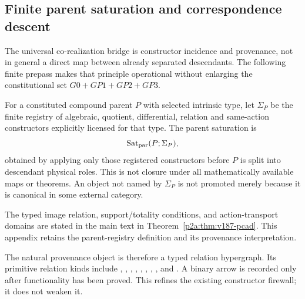 \documentclass[12pt,a4paper]{article}
\begin{document}
\subsection{Finite parent saturation and correspondence descent}
\label{p2a:sec:v187-parent-saturation-pcad}

The universal co-realization bridge is constructor incidence and provenance, not
in general a direct map between already separated descendants.  The following
finite prepass makes that principle operational without enlarging the
constitutional set $G0+GP1+GP2+GP3$.

\begin{definition}
\label{p2a:def:v187-parent-saturation}
For a constituted compound parent $P$ with selected intrinsic type, let
$\Sigma_P$ be the finite registry of algebraic, quotient, differential,
relation and same-action constructors explicitly licensed for that type.  The
parent saturation is
\[
 \operatorname{Sat}_{\rm par}(P;\Sigma_P),
\]
obtained by applying only those registered constructors before $P$ is split
into descendant physical roles.  This is not closure under all mathematically
available maps or theorems.  An object not named by $\Sigma_P$ is not promoted
merely because it is canonical in some external category.
\end{definition}

The typed image relation, support/totality conditions, and action-transport
domains are stated in the main text in
Theorem~\ref{p2a:thm:v187-pcad}. This appendix retains the parent-registry
definition and its provenance interpretation.



\begin{remark}
\label{p2a:rem:v187-relation-hypergraph}
The natural provenance object is therefore a typed relation hypergraph.  Its
primitive relation kinds include ,
, , ,
, , ,
, and .  A binary arrow is
recorded only after functionality has been proved.  This refines the existing
constructor firewall; it does not weaken it.
\end{remark}
\end{document}
